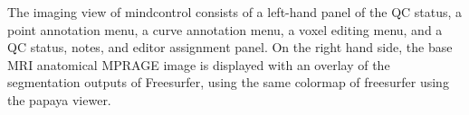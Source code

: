 \label{fig:imagingview}
The imaging view of mindcontrol consists of a left-hand panel of the QC status, a point annotation menu, a curve annotation menu, a voxel editing menu, and a QC status, notes, and editor assignment panel. On the right hand side, the base MRI anatomical MPRAGE image is displayed with an overlay of the segmentation outputs of Freesurfer, using the same colormap of freesurfer using the papaya viewer. 
